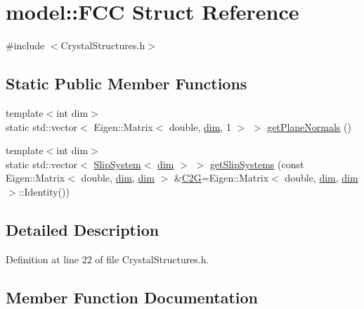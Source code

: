 \hypertarget{structmodel_1_1_f_c_c}{}\section{model\+:\+:F\+C\+C Struct Reference}
\label{structmodel_1_1_f_c_c}


{\ttfamily \#include $<$Crystal\+Structures.\+h$>$}

\subsection*{Static Public Member Functions}
\begin{DoxyCompactItemize}
\item 
{\footnotesize template$<$int dim$>$ }\\static std\+::vector$<$ Eigen\+::\+Matrix$<$ double, \hyperlink{plot_nd_a_8m_a382f3ca768b275b8d563604f7fc7df73}{dim}, 1 $>$ $>$ \hyperlink{structmodel_1_1_f_c_c_ac191551a3f1e16b11668a0ea31e86698}{get\+Plane\+Normals} ()
\item 
{\footnotesize template$<$int dim$>$ }\\static std\+::vector$<$ \hyperlink{structmodel_1_1_slip_system}{Slip\+System}$<$ \hyperlink{plot_nd_a_8m_a382f3ca768b275b8d563604f7fc7df73}{dim} $>$ $>$ \hyperlink{structmodel_1_1_f_c_c_ac671495b1aa77e8c04fbee95c4f811d7}{get\+Slip\+Systems} (const Eigen\+::\+Matrix$<$ double, \hyperlink{plot_nd_a_8m_a382f3ca768b275b8d563604f7fc7df73}{dim}, \hyperlink{plot_nd_a_8m_a382f3ca768b275b8d563604f7fc7df73}{dim} $>$ \&\hyperlink{crystal_rotation_8m_a91d1e9da78391186478a7911c79460ad}{C2\+G}=Eigen\+::\+Matrix$<$ double, \hyperlink{plot_nd_a_8m_a382f3ca768b275b8d563604f7fc7df73}{dim}, \hyperlink{plot_nd_a_8m_a382f3ca768b275b8d563604f7fc7df73}{dim} $>$\+::Identity())
\end{DoxyCompactItemize}


\subsection{Detailed Description}


Definition at line 22 of file Crystal\+Structures.\+h.



\subsection{Member Function Documentation}
\hypertarget{structmodel_1_1_f_c_c_ac191551a3f1e16b11668a0ea31e86698}{}
